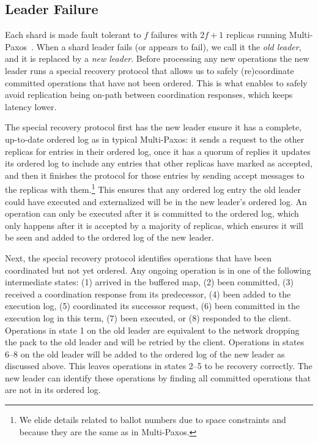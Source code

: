 \subsection{Leader Failure}
\label{subsec:leaderfailures}

Each shard is made fault tolerant to $f$ failures with $2f+1$ replicas running Multi-Paxos~\cite{paxos}.
When a shard leader fails (or appears to fail), we call it the \textit{old leader}, and it is replaced by a \textit{new leader}.
Before processing any new operations the new leader runs a special recovery protocol that allows us to safely (re)coordinate committed operations that have not been ordered.
This is what enables \sys{} to safely avoid replication being on-path between coordination responses, which keeps latency lower.

The special recovery protocol first has the new leader ensure it has a complete, up-to-date ordered log as in typical Multi-Paxos:
it sends a request to the other replicas for entries in their ordered log,
once it has a quorum of replies it updates its ordered log to include any entries that other replicas have marked as accepted,
and then it finishes the protocol for those entries by sending accept messages to the replicas with them.\footnote{We elide details related to ballot numbers due to space constraints and because they are the same as in Multi-Paxos.}
This ensures that any ordered log entry the old leader could have executed and externalized will be in the new leader's ordered log.
An operation can only be executed after it is committed to the ordered log,
which only happens after it is accepted by a majority of replicas,
which ensures it will be seen and added to the ordered log of the new leader.

Next, the special recovery protocol identifies operations that have been coordinated but not yet ordered.
Any ongoing operation is in one of the following intermediate states:
(1) arrived in the buffered map,
(2) been committed,
(3) received a coordination response from its predecessor,
(4) been added to the execution log,
(5) coordinated its successor request,
(6) been committed in the execution log in this term,
(7) been executed, or
(8) responded to the client.
Operations in state 1 on the old leader are equivalent to the network dropping the pack to the old leader and will be retried by the client.
Operations in states 6--8 on the old leader will be added to the ordered log of the new leader as discussed above.
This leaves operations in states 2--5 to be recovery correctly.
The new leader can identify these operations by finding all committed operations that are not in its ordered log.

